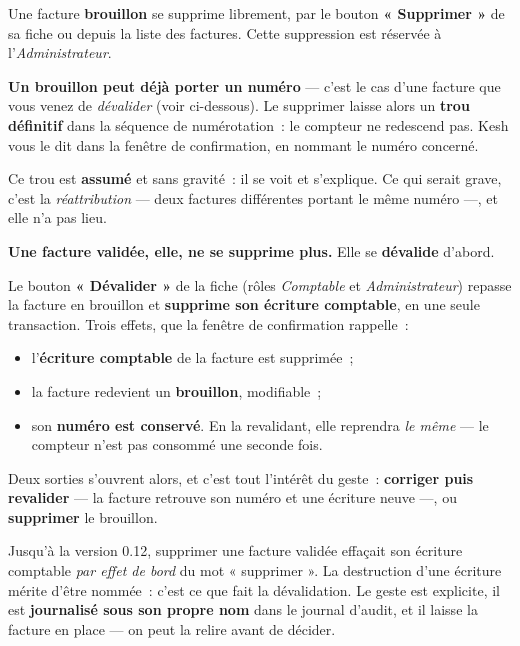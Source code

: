 \documentclass[a4paper,11pt,oneside]{article}
\begin{document}
Une facture \textbf{brouillon} se supprime librement, par le bouton \textbf{« Supprimer »} de sa
fiche ou depuis la liste des factures. Cette suppression est réservée à l'\emph{Administrateur}.

\begin{keshwarning}
\textbf{Un brouillon peut déjà porter un numéro} --- c'est le cas d'une facture que vous venez de
\emph{dévalider} (voir ci-dessous). Le supprimer laisse alors un \textbf{trou définitif} dans la
séquence de numérotation~: le compteur ne redescend pas. Kesh vous le dit dans la fenêtre de
confirmation, en nommant le numéro concerné.

Ce trou est \textbf{assumé} et sans gravité~: il se voit et s'explique. Ce qui serait grave, c'est
la \emph{réattribution} --- deux factures différentes portant le même numéro ---, et elle n'a pas
lieu.
\end{keshwarning}

\medskip
\noindent\textbf{Une facture validée, elle, ne se supprime plus.} Elle se \textbf{dévalide}
d'abord.

Le bouton \textbf{« Dévalider »} de la fiche (rôles \emph{Comptable} et \emph{Administrateur})
repasse la facture en brouillon et \textbf{supprime son écriture comptable}, en une seule
transaction. Trois effets, que la fenêtre de confirmation rappelle~:

\begin{itemize}
    \item l'\textbf{écriture comptable} de la facture est supprimée~;
    \item la facture redevient un \textbf{brouillon}, modifiable~;
    \item son \textbf{numéro est conservé}. En la revalidant, elle reprendra \emph{le même} --- le
          compteur n'est pas consommé une seconde fois.
\end{itemize}

Deux sorties s'ouvrent alors, et c'est tout l'intérêt du geste~: \textbf{corriger puis revalider}
--- la facture retrouve son numéro et une écriture neuve ---, ou \textbf{supprimer} le brouillon.

\begin{keshtip}[title={\faLightbulb\ Pourquoi deux gestes plutôt qu'un}]
Jusqu'à la version 0.12, supprimer une facture validée effaçait son écriture comptable \emph{par
effet de bord} du mot « supprimer ». La destruction d'une écriture mérite d'être nommée~: c'est ce
que fait la dévalidation. Le geste est explicite, il est \textbf{journalisé sous son propre nom}
dans le journal d'audit, et il laisse la facture en place --- on peut la relire avant de décider.
\end{keshtip}
\end{document}
